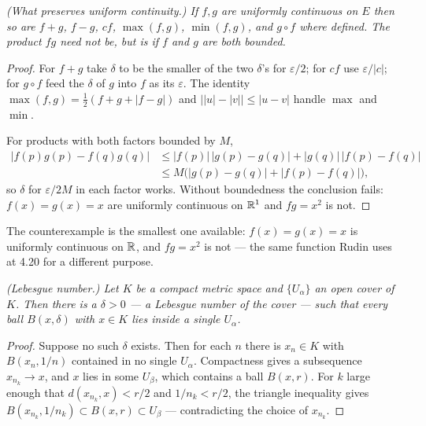 \emph{(What preserves uniform continuity.) If $f,g$ are uniformly continuous
on $E$ then so are $f+g$, $f-g$, $cf$, $\max(f,g)$, $\min(f,g)$, and $g\circ
f$ where defined. The product $fg$ need not be, but is if $f$ and $g$ are
both bounded.}
\begin{proof}
For $f+g$ take $\delta$ to be the smaller of the two $\delta$'s for
$\varepsilon/2$; for $cf$ use $\varepsilon/|c|$; for $g \circ f$ feed the
$\delta$ of $g$ into $f$ as its $\varepsilon$. The identity
$\max(f,g) = \tfrac12(f+g+|f-g|)$ and $\bigl||u|-|v|\bigr| \le |u-v|$ handle
$\max$ and $\min$.

For products with both factors bounded by $M$,
\begin{align*}
  |f(p)g(p)-f(q)g(q)|
    &\le |f(p)|\,|g(p)-g(q)| + |g(q)|\,|f(p)-f(q)|\\
    &\le M\bigl(|g(p)-g(q)|+|f(p)-f(q)|\bigr),
\end{align*}
so $\delta$ for $\varepsilon/2M$ in each factor works. Without boundedness
the conclusion fails: $f(x)=g(x)=x$ are uniformly continuous on $\mathbb{R}^1$ and
$fg=x^2$ is not.
\end{proof}

\noindent
The counterexample is the smallest one available: $f(x)=g(x)=x$ is uniformly
continuous on $\mathbb{R}$, and $fg = x^2$ is not --- the same function Rudin uses at
4.20 for a different purpose.

\emph{(Lebesgue number.) Let $K$ be a compact metric space and
$\{U_\alpha\}$ an open cover of $K$. Then there is a $\delta>0$ --- a
\emph{Lebesgue number} of the cover --- such that every ball
$B(x,\delta)$ with $x \in K$ lies inside a single $U_\alpha$.}
\begin{proof}
Suppose no such $\delta$ exists. Then for each $n$ there is $x_n \in K$ with
$B(x_n,1/n)$ contained in no single $U_\alpha$. Compactness gives a
subsequence $x_{n_k} \to x$, and $x$ lies in some $U_\beta$, which contains a
ball $B(x,r)$. For $k$ large enough that $d(x_{n_k},x)<r/2$ and
$1/n_k < r/2$, the triangle inequality gives
$B(x_{n_k},1/n_k) \subset B(x,r) \subset U_\beta$ --- contradicting the
choice of $x_{n_k}$.
\end{proof}


